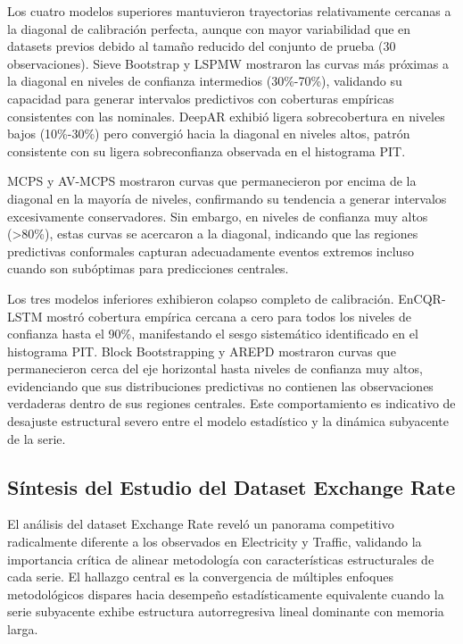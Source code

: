 Los cuatro modelos superiores mantuvieron trayectorias relativamente cercanas a la diagonal de calibración perfecta, aunque con mayor variabilidad que en datasets previos debido al tamaño reducido del conjunto de prueba (30 observaciones). Sieve Bootstrap y LSPMW mostraron las curvas más próximas a la diagonal en niveles de confianza intermedios (30\%-70\%), validando su capacidad para generar intervalos predictivos con coberturas empíricas consistentes con las nominales. DeepAR exhibió ligera sobrecobertura en niveles bajos (10\%-30\%) pero convergió hacia la diagonal en niveles altos, patrón consistente con su ligera sobreconfianza observada en el histograma PIT.

MCPS y AV-MCPS mostraron curvas que permanecieron por encima de la diagonal en la mayoría de niveles, confirmando su tendencia a generar intervalos excesivamente conservadores. Sin embargo, en niveles de confianza muy altos (>80\%), estas curvas se acercaron a la diagonal, indicando que las regiones predictivas conformales capturan adecuadamente eventos extremos incluso cuando son subóptimas para predicciones centrales.

Los tres modelos inferiores exhibieron colapso completo de calibración. EnCQR-LSTM mostró cobertura empírica cercana a cero para todos los niveles de confianza hasta el 90\%, manifestando el sesgo sistemático identificado en el histograma PIT. Block Bootstrapping y AREPD mostraron curvas que permanecieron cerca del eje horizontal hasta niveles de confianza muy altos, evidenciando que sus distribuciones predictivas no contienen las observaciones verdaderas dentro de sus regiones centrales. Este comportamiento es indicativo de desajuste estructural severo entre el modelo estadístico y la dinámica subyacente de la serie.

\subsection{Síntesis del Estudio del Dataset Exchange Rate}
\label{subsec:exchange_sintesis}

El análisis del dataset Exchange Rate reveló un panorama competitivo radicalmente diferente a los observados en Electricity y Traffic, validando la importancia crítica de alinear metodología con características estructurales de cada serie. El hallazgo central es la convergencia de múltiples enfoques metodológicos dispares hacia desempeño estadísticamente equivalente cuando la serie subyacente exhibe estructura autorregresiva lineal dominante con memoria larga.

